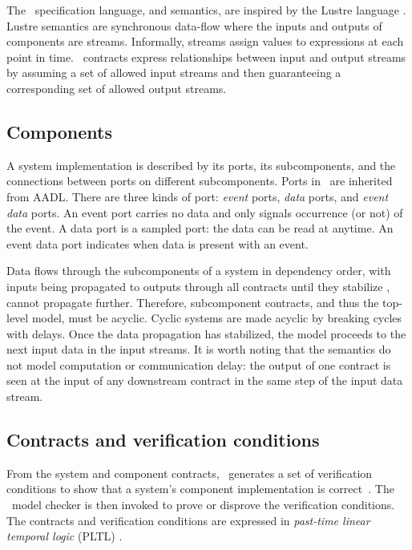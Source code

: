 
\newcommand{\globally}{\konst{Always}}
\newcommand{\historically}{\konst{Hist}}
\newcommand{\assumes}{\ensuremath{A}}
\newcommand{\guarantees}{\ensuremath{P}}
\newcommand{\inputs}{\ensuremath{I}}
\newcommand{\outputs}{\ensuremath{O}}
\newcommand{\components}{\ensuremath{C}}
\newcommand{\component}{\ensuremath{c}}

The \agr\ specification language, and semantics, are inspired by the
Lustre language \cite{10.1145/41625.41641}. Lustre semantics are
synchronous data-flow where the inputs and outputs of components are
streams.  Informally, streams assign values to expressions at each
point in time.  \agr\ contracts express relationships between input
and output streams by assuming a set of allowed input streams and then
guaranteeing a corresponding set of allowed output streams.

\subsection{Components}
A system implementation is described by its ports, its subcomponents,
and the connections between ports on different subcomponents.  Ports
in \agr\ are inherited from AADL.  There are three kinds of port:
\emph{event} ports, \emph{data} ports, and \emph{event data} ports.
An event port carries no data and only signals occurrence (or not) of the
event. A data port is a sampled port: the data can be read at anytime.
An event data port indicates when data is present with an event.

Data flows through the subcomponents of a system in dependency order,
with inputs being propagated to outputs through all contracts until
they stabilize \ie, cannot propagate further. Therefore, subcomponent
contracts, and thus the top-level model, must be acyclic.  Cyclic
systems are made acyclic by breaking cycles with delays.  Once the
data propagation has stabilized, the model proceeds to the next input
data in the input streams. It is worth noting that the semantics do
not model computation or communication delay: the output of one
contract is seen at the input of any downstream contract in the same
step of the input data stream.



\subsection{Contracts and verification conditions}

From the system and component contracts, \agr\ generates a set of
verification conditions to show that a system's component
implementation is correct~\cite{agree2013}.  The \agr\ model checker
is then invoked to prove or disprove the verification
conditions. The contracts and verification conditions are expressed in
\emph{past-time linear temporal logic} (PLTL) \cite{10.1093/jigpal/8.1.55}.

